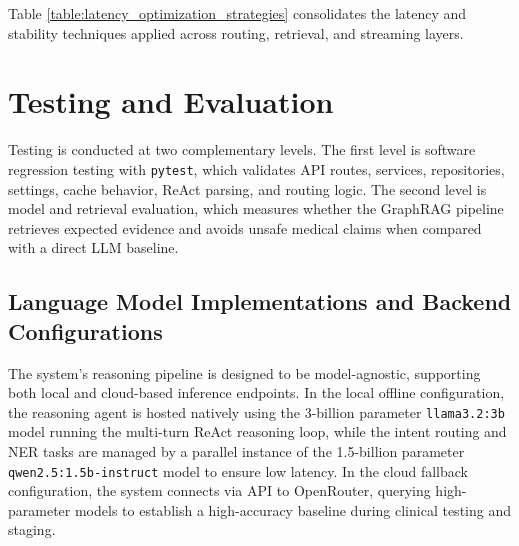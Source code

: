 \documentclass[../main.tex]{subfiles}
\begin{document}
\begin{table}[H]
\centering
{}
\caption{Latency and stability optimization strategies used in the implemented system}
\label{table:latency_optimization_strategies}
\end{table}

Table \ref{table:latency_optimization_strategies} consolidates the latency and stability techniques applied across routing, retrieval, and streaming layers.


\section{Testing and Evaluation}
\label{section:4.4}

Testing is conducted at two complementary levels. The first level is software regression testing with \texttt{pytest}, which validates API routes, services, repositories, settings, cache behavior, ReAct parsing, and routing logic. The second level is model and retrieval evaluation, which measures whether the GraphRAG pipeline retrieves expected evidence and avoids unsafe medical claims when compared with a direct LLM baseline.

\subsection{Language Model Implementations and Backend Configurations}
The system's reasoning pipeline is designed to be model-agnostic, supporting both local and cloud-based inference endpoints. In the local offline configuration, the reasoning agent is hosted natively using the 3-billion parameter \texttt{llama3.2:3b} model running the multi-turn ReAct reasoning loop, while the intent routing and NER tasks are managed by a parallel instance of the 1.5-billion parameter \texttt{qwen2.5:1.5b-instruct} model to ensure low latency. In the cloud fallback configuration, the system connects via API to OpenRouter, querying high-parameter models to establish a high-accuracy baseline during clinical testing and staging.
\end{document}
